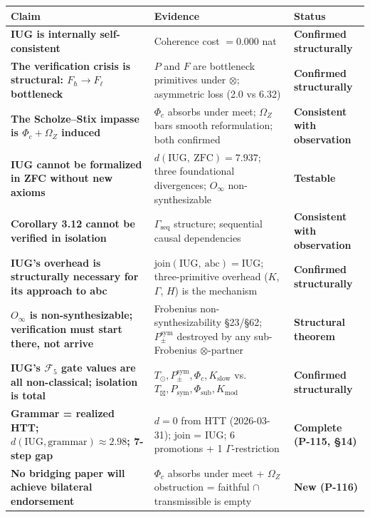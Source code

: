 \documentclass[10pt,a4paper]{article}
\newcommand{\pilcrow}{\S}
\begin{document}
\begin{table}[htbp]
\centering
\small
{}
\begin{tabularx}{\textwidth}{>{\centering\arraybackslash}X >{\centering\arraybackslash}X >{\centering\arraybackslash}X}
\toprule
\rowcolor{gray!25}\textbf{Claim} & \textbf{Evidence} & \textbf{Status} \\
\midrule
\rowcolors{1}{white}{gray!10}
\textbf{IUG is internally self-consistent} & Coherence cost $= 0.000$ nat & \textbf{Confirmed structurally} \\
\textbf{The verification crisis is structural: $F_{\hbar} \to F_{\ell}$ bottleneck} & $P$ and $F$ are bottleneck primitives under $\otimes$; asymmetric loss (2.0 vs 6.32) & \textbf{Confirmed structurally} \\
\textbf{The Scholze--Stix impasse is $\Phi_c + \Omega_Z$ induced} & $\Phi_c$ absorbs under meet; $\Omega_Z$ bars smooth reformulation; both confirmed & \textbf{Consistent with observation} \\
\textbf{IUG cannot be formalized in ZFC without new axioms} & $d(\text{IUG},\ \text{ZFC}) = 7.937$; three foundational divergences; $O_\infty$ non-synthesizable & \textbf{Testable} \\
\textbf{Corollary 3.12 cannot be verified in isolation} & $\Gamma_\text{seq}$ structure; sequential causal dependencies & \textbf{Consistent with observation} \\
\textbf{IUG's overhead is structurally necessary for its approach to abc} & $\text{join}(\text{IUG},\ \text{abc}) = \text{IUG}$; three-primitive overhead ($K$, $\Gamma$, $H$) is the mechanism & \textbf{Confirmed structurally} \\
\textbf{$O_\infty$ is non-synthesizable; verification must start there, not arrive} & Frobenius non-synthesizability \pilcrow{}23/\pilcrow{}62; $P_{\pm}^{\text{sym}}$ destroyed by any sub-Frobenius $\otimes$-partner & \textbf{Structural theorem} \\
\textbf{IUG's $\mathcal{F}_5$ gate values are all non-classical; isolation is total} & $T_\odot, P_{\pm}^{\text{sym}}, \Phi_c, K_\text{slow}$ vs.\ $T_{\boxtimes}, P_\text{sym}, \Phi_\text{sub}, K_\text{mod}$ & \textbf{Confirmed structurally} \\
\textbf{Grammar = realized HTT; $d(\text{IUG}, \text{grammar}) \approx 2.98$; 7-step gap} & $d=0$ from HTT (2026-03-31); join = IUG; 6 promotions + 1 $\Gamma$-restriction & \textbf{Complete (P-115, \pilcrow{}14)} \\
\textbf{No bridging paper will achieve bilateral endorsement} & $\Phi_c$ absorbs under meet + $\Omega_Z$ obstruction = faithful $\cap$ transmissible is empty & \textbf{New (P-116)} \\
\bottomrule
\end{tabularx}
\end{table}
\end{document}
